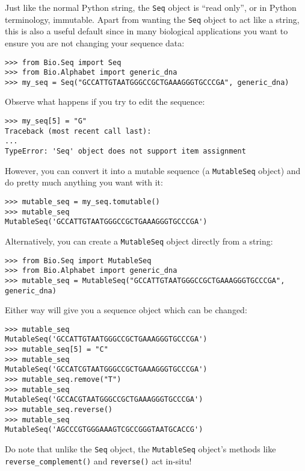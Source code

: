 {Just like the normal Python string, the \verb|Seq| object is ``read only'', or in Python terminology, immutable.  Apart from wanting the \verb|Seq| object to act like a string, this is also a useful default since in many biological applications you want to ensure you are not changing your sequence data:

\begin{verbatim}
>>> from Bio.Seq import Seq
>>> from Bio.Alphabet import generic_dna
>>> my_seq = Seq("GCCATTGTAATGGGCCGCTGAAAGGGTGCCCGA", generic_dna)
\end{verbatim}

Observe what happens if you try to edit the sequence:
\begin{verbatim}
>>> my_seq[5] = "G"
Traceback (most recent call last):
...
TypeError: 'Seq' object does not support item assignment
\end{verbatim}

However, you can convert it into a mutable sequence (a \verb|MutableSeq| object) and do pretty much anything you want with it:

\begin{verbatim}
>>> mutable_seq = my_seq.tomutable()
>>> mutable_seq
MutableSeq('GCCATTGTAATGGGCCGCTGAAAGGGTGCCCGA')
\end{verbatim}

Alternatively, you can create a \verb|MutableSeq| object directly from a string:

\begin{verbatim}
>>> from Bio.Seq import MutableSeq
>>> from Bio.Alphabet import generic_dna
>>> mutable_seq = MutableSeq("GCCATTGTAATGGGCCGCTGAAAGGGTGCCCGA", generic_dna)
\end{verbatim}

Either way will give you a sequence object which can be changed:

\begin{verbatim}
>>> mutable_seq
MutableSeq('GCCATTGTAATGGGCCGCTGAAAGGGTGCCCGA')
>>> mutable_seq[5] = "C"
>>> mutable_seq
MutableSeq('GCCATCGTAATGGGCCGCTGAAAGGGTGCCCGA')
>>> mutable_seq.remove("T")
>>> mutable_seq
MutableSeq('GCCACGTAATGGGCCGCTGAAAGGGTGCCCGA')
>>> mutable_seq.reverse()
>>> mutable_seq
MutableSeq('AGCCCGTGGGAAAGTCGCCGGGTAATGCACCG')
\end{verbatim}

Do note that unlike the \verb|Seq| object, the \verb|MutableSeq| object's methods like \verb|reverse_complement()| and \verb|reverse()| act in-situ!

}
